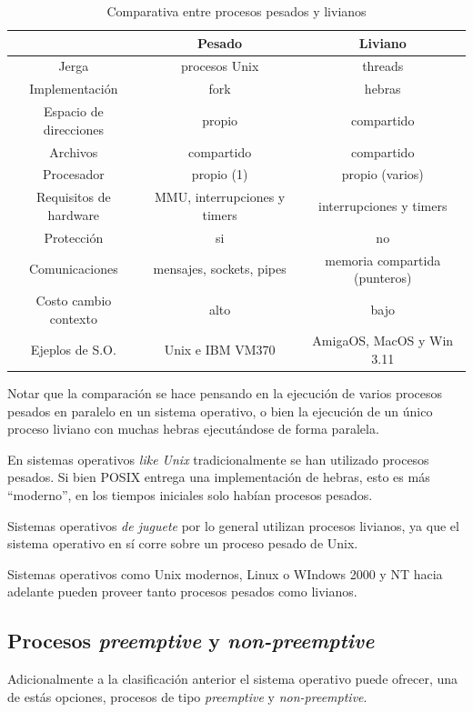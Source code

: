 \begin{table}[hbt]
	\centering
	\begin{tabular}{|c|c|c|}
		\hline
						& Pesado			& Liviano \\
		\hline
			Jerga			& procesos Unix			& threads \\
			Implementación		& fork				& hebras \\
			Espacio de direcciones	& propio  			& compartido \\
			Archivos		& compartido			& compartido \\
			Procesador		& propio (1)			& propio (varios) \\
			Requisitos de hardware	& MMU, interrupciones y timers	& interrupciones y timers \\
			Protección		& si				& no \\
			Comunicaciones		& mensajes, sockets, pipes	& memoria compartida (punteros) \\
			Costo cambio contexto	& alto				& bajo \\
			Ejeplos	de S.O.		& Unix e IBM VM370		& AmigaOS, MacOS y Win 3.11 \\
		\hline
	\end{tabular}
	\caption{Comparativa entre procesos pesados y livianos}
	\label{tab:procesos_clasificacion}
\end{table}

Notar que la comparación se hace pensando en la ejecución de varios procesos
pesados en paralelo en un sistema operativo, o bien la ejecución de un único
proceso liviano con muchas hebras ejecutándose de forma paralela.

En sistemas operativos \textit{like Unix} tradicionalmente se han utilizado
procesos pesados. Si bien POSIX entrega una implementación de hebras, esto es
más ``moderno'', en los tiempos iniciales solo habían procesos pesados.

Sistemas operativos \textit{de juguete} por lo general utilizan procesos
livianos, ya que el sistema operativo en sí corre sobre un proceso pesado de
Unix.

Sistemas operativos como Unix modernos, Linux o WIndows 2000 y NT hacia adelante
pueden proveer tanto procesos pesados como livianos.

\subsection{Procesos \textit{preemptive} y \textit{non-preemptive}}
Adicionalmente a la clasificación anterior el sistema operativo puede ofrecer,
una de estás opciones, procesos de tipo \textit{preemptive} y
\textit{non-preemptive}.

